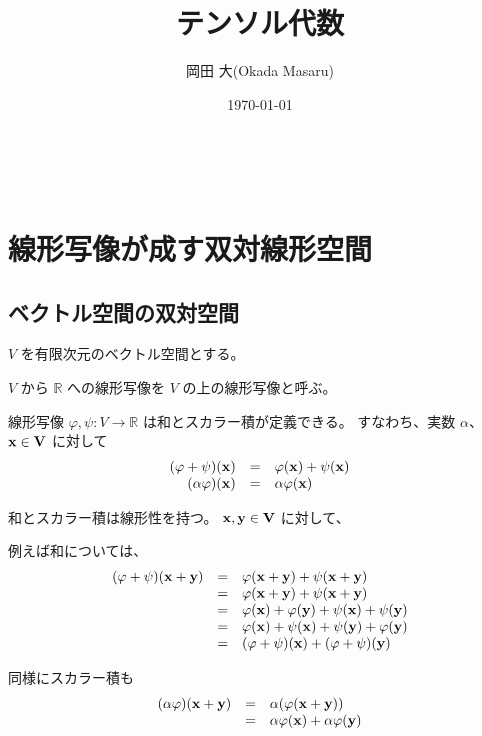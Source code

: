 \documentclass[uplatex,a4j,12pt,dvipdfmx]{jsarticle}
\title{
テンソル代数
}
\author{岡田 大(Okada Masaru)}
\date{\today}
\begin{document}
\maketitle

\tableofcontents

\ \\

\section{線形写像が成す双対線形空間}

\subsection{ベクトル空間の双対空間}

$V$ を有限次元のベクトル空間とする。

$V$ から $\mathbb{R}$ への線形写像を $V$ の上の線形写像と呼ぶ。

線形写像 $\varphi, \psi : V \to \mathbb{R}$
は和とスカラー積が定義できる。
すなわち、実数 $\alpha$、
$\bf{x} \in V$ に対して
\[
	\begin{array}{rcl}
		(\varphi + \psi) (\bf{x}) & = & \varphi (\bf{x}) + \psi (\bf{x})
		\\
		(\alpha \varphi) (\bf{x}) & = & \alpha \varphi (\bf{x})
	\end{array}
\]

和とスカラー積は線形性を持つ。
$\bf{x}, \bf{y} \in V$
に対して、

例えば和については、
\[
	\begin{array}{rcl}
		(\varphi + \psi) (\bf{x} + \bf{y}) & = & \varphi (\bf{x} + \bf{y}) + \psi (\bf{x} + \bf{y})
		\\
		                                   & = &
		\varphi (\bf{x} + \bf{y}) + \psi (\bf{x} + \bf{y})
		\\
		                                   & = &
		\varphi (\bf{x}) + \varphi (\bf{y})
		+
		\psi (\bf{x}) + \psi (\bf{y})
		\\
		                                   & = &
		\varphi (\bf{x}) + \psi (\bf{x})
		+ \psi (\bf{y}) + \varphi (\bf{y})
		\\
		                                   & = &
		(\varphi + \psi) (\bf{x}) + (\varphi + \psi) (\bf{y})
	\end{array}
\]

同様にスカラー積も
\[
	\begin{array}{rcl}
		(\alpha \varphi) (\bf{x} + \bf{y}) & = & \alpha ( \varphi (\bf{x} + \bf{y}) )
		\\
		                                   & = &
		\alpha \varphi (\bf{x}) + \alpha \varphi (\bf{y})
	\end{array}
\]
\end{document}
